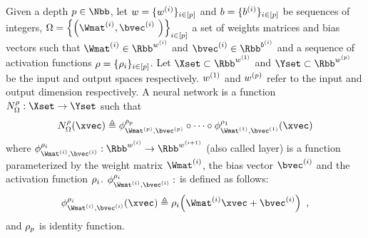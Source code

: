 \begin{definition} \label{definition:ch2-neural_networks}
  Given a depth $\depth \in \Nbb$, 
  let $w = \{ w^{(i)} \}_{i \in [p]}$ and $b = \{ b^{(i)} \}_{i \in [p]}$ be sequences of integers, $\weights = \left\{ \left( \Wmat^{(i)}, \bvec^{(i)} \right) \right\}_{i \in [\depth]}$ a set of weights matrices and bias vectors 
  such that $\Wmat^{(i)} \in \Rbb^{\dimw^{(i)}}$ and $\bvec^{(i)} \in \Rbb^{\dimb^{(i)}}$ and a sequence of activation functions $\rho = \{\rho_i \}_{i \in [p]}$.
  Let $\Xset \subset \Rbb^{\dimw^{(1)}}$ and $\Yset \subset \Rbb^{\dimw^{(\depth)}}$ be the input and output spaces respectively.
	$w^{(1)}$ and $w^{(p)}$ refer to the input and output dimension respectively.
  A neural network is a function $\nn^\act_\weights : \Xset \rightarrow \Yset$ such that
  \begin{equation}
    \nn^\act_{\weights}(\xvec) \triangleq \layer^{\act_\depth}_{\Wmat^{(\depth)}, \bvec^{(\depth)}} \circ \cdots \circ \layer^{\act_1}_{\Wmat^{(1)}, \bvec^{(1)}}(\xvec)
  \end{equation}
  where $\layer^{\act_i}_{\Wmat^{(i)},\bvec^{(i)}}: \Rbb^{w^{(i)}} \rightarrow \Rbb^{w^{(i+1)}}$ (also called layer) is a function parameterized by the weight matrix $\Wmat^{(i)}$, the bias vector $\bvec^{(i)}$ and the activation function $\rho_i$.
  $\layer^{\act_i}_{\Wmat^{(i)},\bvec^{(i)}}:$  is defined as follows: 
  \begin{equation}
    \layer^{\act_i}_{\Wmat^{(i)},\bvec^{(i)}} (\xvec) \triangleq \act_i \left(\Wmat^{(i)}\xvec + \bvec^{(i)}\right) \enspace,
  \end{equation}
  and $\rho_p$ is identity function.
\end{definition}

